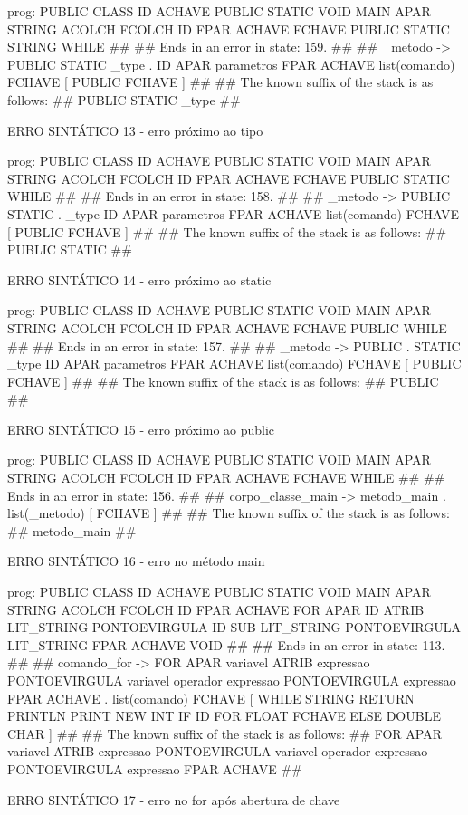 \documentclass[12pt,a4paper,twoside]{report}
\begin{document}
\begin{terminal}
prog: PUBLIC CLASS ID ACHAVE PUBLIC STATIC VOID MAIN APAR STRING ACOLCH FCOLCH ID FPAR ACHAVE FCHAVE PUBLIC STATIC STRING WHILE 
##
## Ends in an error in state: 159.
##
## _metodo -> PUBLIC STATIC _type . ID APAR parametros FPAR ACHAVE list(comando) FCHAVE [ PUBLIC FCHAVE ]
##
## The known suffix of the stack is as follows:
## PUBLIC STATIC _type 
##

ERRO SINTÁTICO 13 -  erro próximo ao tipo 

prog: PUBLIC CLASS ID ACHAVE PUBLIC STATIC VOID MAIN APAR STRING ACOLCH FCOLCH ID FPAR ACHAVE FCHAVE PUBLIC STATIC WHILE 
##
## Ends in an error in state: 158.
##
## _metodo -> PUBLIC STATIC . _type ID APAR parametros FPAR ACHAVE list(comando) FCHAVE [ PUBLIC FCHAVE ]
##
## The known suffix of the stack is as follows:
## PUBLIC STATIC 
##

ERRO SINTÁTICO 14 -  erro próximo ao static

prog: PUBLIC CLASS ID ACHAVE PUBLIC STATIC VOID MAIN APAR STRING ACOLCH FCOLCH ID FPAR ACHAVE FCHAVE PUBLIC WHILE 
##
## Ends in an error in state: 157.
##
## _metodo -> PUBLIC . STATIC _type ID APAR parametros FPAR ACHAVE list(comando) FCHAVE [ PUBLIC FCHAVE ]
##
## The known suffix of the stack is as follows:
## PUBLIC 
##

ERRO SINTÁTICO 15 -  erro próximo ao public
 
prog: PUBLIC CLASS ID ACHAVE PUBLIC STATIC VOID MAIN APAR STRING ACOLCH FCOLCH ID FPAR ACHAVE FCHAVE WHILE 
##
## Ends in an error in state: 156.
##
## corpo_classe_main -> metodo_main . list(_metodo) [ FCHAVE ]
##
## The known suffix of the stack is as follows:
## metodo_main 
##

ERRO SINTÁTICO 16 -  erro no método main

prog: PUBLIC CLASS ID ACHAVE PUBLIC STATIC VOID MAIN APAR STRING ACOLCH FCOLCH ID FPAR ACHAVE FOR APAR ID ATRIB LIT_STRING PONTOEVIRGULA ID SUB LIT_STRING PONTOEVIRGULA LIT_STRING FPAR ACHAVE VOID 
##
## Ends in an error in state: 113.
##
## comando_for -> FOR APAR variavel ATRIB expressao PONTOEVIRGULA variavel operador expressao PONTOEVIRGULA expressao FPAR ACHAVE . list(comando) FCHAVE [ WHILE STRING RETURN PRINTLN PRINT NEW INT IF ID FOR FLOAT FCHAVE ELSE DOUBLE CHAR ]
##
## The known suffix of the stack is as follows:
## FOR APAR variavel ATRIB expressao PONTOEVIRGULA variavel operador expressao PONTOEVIRGULA expressao FPAR ACHAVE 
##

ERRO SINTÁTICO 17 - erro no for após abertura de chave


\end{terminal}
\end{document}
